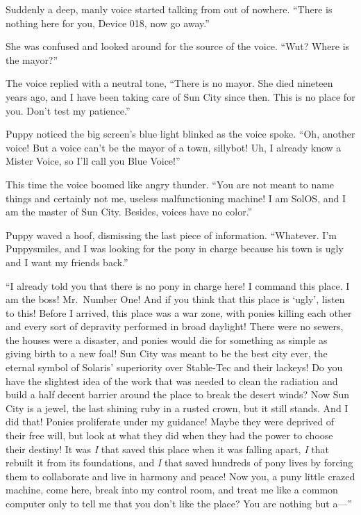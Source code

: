 Suddenly a deep, manly voice started talking from out of nowhere. ``There is nothing here for you, Device 018, now go away.''

She was confused and looked around for the source of the voice. ``Wut? Where is the mayor?''

The voice replied with a neutral tone, ``There is no mayor. She died nineteen years ago, and I have been taking care of Sun City since then. This is no place for you. Don't test my patience.''

Puppy noticed the big screen's blue light blinked as the voice spoke. ``Oh, another voice! But a voice can't be the mayor of a town, sillybot! Uh, I already know a Mister Voice, so I'll call you Blue Voice!''

This time the voice boomed like angry thunder. ``You are not meant to name things and certainly not me, useless malfunctioning machine! I am SolOS, and I am the master of Sun City. Besides, voices have no color.''

Puppy waved a hoof, dismissing the last piece of information. ``Whatever. I'm Puppysmiles, and I was looking for the pony in charge because his town is ugly and I want my friends back.''

``I already told you that there is no pony in charge here! I command this place. I am the boss! Mr.~Number One! And if you think that this place is `ugly', listen to this! Before I arrived, this place was a war zone, with ponies killing each other and every sort of depravity performed in broad daylight! There were no sewers, the houses were a disaster, and ponies would die for something as simple as giving birth to a new foal! Sun City was meant to be the best city ever, the eternal symbol of Solaris' superiority over Stable-Tec and their lackeys! Do you have the slightest idea of the work that was needed to clean the radiation and build a half decent barrier around the place to break the desert winds? Now Sun City is a jewel, the last shining ruby in a rusted crown, but it still stands. And I did that! Ponies proliferate under my guidance! Maybe they were deprived of their free will, but look at what they did when they had the power to choose their destiny! It was \emph{I} that saved this place when it was falling apart, \emph{I} that rebuilt it from its foundations, and \emph{I} that saved hundreds of pony lives by forcing them to collaborate and live in harmony and peace! Now you, a puny little crazed machine, come here, break into my control room, and treat me like a common computer only to tell me that you don't like the place? You are nothing but a---''


